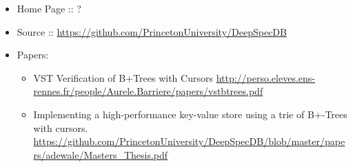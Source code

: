 \documentclass[12pt,twoside]{article}
\begin{document}
\begin{itemize}[noitemsep,topsep=\mdcompacttopsep]%

\item{}Home Page :: ?%

\item{}Source :: \href{https://github.com/PrincetonUniversity/DeepSpecDB}{{\ttfamily https://\hspace{0pt}github.\hspace{0pt}com/\hspace{0pt}PrincetonUniversity/\hspace{0pt}DeepSpecDB}}%

\item{}Papers:

\begin{itemize}[noitemsep,topsep=\mdcompacttopsep]%

\item{}VST Verification of B+Trees with Cursors
\href{http://perso.eleves.ens-rennes.fr/people/Aurele.Barriere/papers/vstbtrees.pdf}{{\ttfamily http://\hspace{0pt}perso.\hspace{0pt}eleves.\hspace{0pt}ens-\hspace{0pt}rennes.\hspace{0pt}fr/\hspace{0pt}people/\hspace{0pt}Aurele.\hspace{0pt}Barriere/\hspace{0pt}papers/\hspace{0pt}vstbtrees.\hspace{0pt}pdf}}%

\item{}Implementing a high-performance key-value store using a trie of
B+-Trees with cursors.
\href{https://github.com/PrincetonUniversity/DeepSpecDB/blob/master/papers/adewale/Masters_Thesis.pdf}{{\ttfamily https://\hspace{0pt}github.\hspace{0pt}com/\hspace{0pt}PrincetonUniversity/\hspace{0pt}DeepSpecDB/\hspace{0pt}blob/\hspace{0pt}master/\hspace{0pt}papers/\hspace{0pt}adewale/\hspace{0pt}Masters\_\hspace{0pt}Thesis.\hspace{0pt}pdf}}%


\end{itemize}
\end{itemize}
\end{document}
